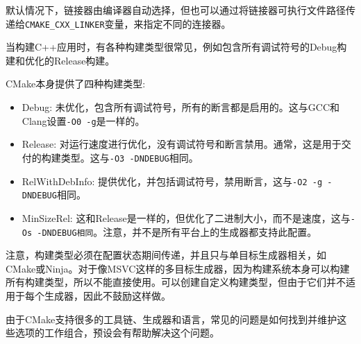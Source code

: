 默认情况下，链接器由编译器自动选择，但也可以通过将链接器可执行文件路径传递给\texttt{CMAKE\_CXX\_LINKER}变量，来指定不同的连接器。


当构建C++应用时，有各种构建类型很常见，例如包含所有调试符号的Debug构建和优化的Release构建。

CMake本身提供了四种构建类型:

\begin{itemize}
\item 
Debug: 未优化，包含所有调试符号，所有的断言都是启用的。这与GCC和Clang设置\texttt{-O0 -g}是一样的。

\item 
Release: 对运行速度进行优化，没有调试符号和断言禁用。通常，这是用于交付的构建类型。这与\texttt{-O3 -DNDEBUG}相同。

\item 
RelWithDebInfo: 提供优化，并包括调试符号，禁用断言，这与\texttt{-O2 -g -DNDEBUG}相同。

\item 
MinSizeRel: 这和Release是一样的，但优化了二进制大小，而不是速度，这与\texttt{-Os -DNDEBUG相同}。注意，并不是所有平台上的生成器都支持此配置。
\end{itemize}

注意，构建类型必须在配置状态期间传递，并且只与单目标生成器相关，如CMake或Ninja。对于像MSVC这样的多目标生成器，因为构建系统本身可以构建所有构建类型，所以不能直接使用。可以创建自定义构建类型，但由于它们并不适用于每个生成器，因此不鼓励这样做。

由于CMake支持很多的工具链、生成器和语言，常见的问题是如何找到并维护这些选项的工作组合，预设会有帮助解决这个问题。



































